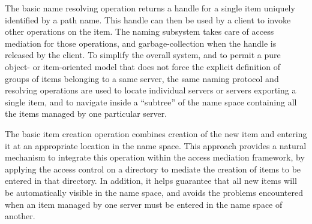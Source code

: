 The basic name resolving operation returns a handle for a single item
uniquely identified by a path name. This handle can then be used by a
client to invoke other operations on the item. The naming subsystem
takes care of access mediation for those operations, and
garbage-collection when the handle is released by the client.  To
simplify the overall system, and to permit a pure object- or
item-oriented model that does not force the explicit definition of
groups of items belonging to a same server, the same naming protocol
and resolving operations are used to locate individual servers or
servers exporting a single item, and to navigate inside a ``subtree''
of the name space containing all the items managed by one particular
server.

The basic item creation operation combines creation of the new item
and entering it at an appropriate location in the name space.  This
approach provides a natural mechanism to integrate this operation
within the access mediation framework, by applying the access control
on a directory to mediate the creation of items to be entered in that
directory. In addition, it helps guarantee that all new items will be
automatically visible in the name space, and avoids the problems
encountered when an item managed by one server must be entered in the
name space of another.

